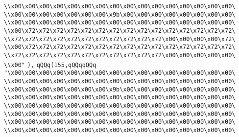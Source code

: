\verb|\\x00\x00\x00\x00\x00\x00\x00\x00\x00\x00\x00\x00\x00\x00\x00\x00\|\newline
\verb|\\x00\x00\x00\x00\x00\x00\x00\x9b\x00\x00\x00\x00\x00\x00\x00\x00\|\newline
\verb|\\x00\x00\x00\x00\x00\x00\x00\x00\x00\x00\x00\x00\x00\x00\x00\x00\|\newline
\verb|\\x00\x72\x72\x72\x72\x72\x72\x72\x72\x72\x72\x72\x72\x72\x72\x72\|\newline
\verb|\\x72\x72\x72\x72\x72\x72\x72\x72\x72\x72\x72\x00\x00\x00\x00\x72\|\newline
\verb|\\x00\x72\x72\x72\x72\x72\x72\x72\x72\x72\x72\x72\x72\x72\x72\x72\|\newline
\verb|\\x72\x72\x72\x72\x72\x72\x72\x72\x72\x72\x72\x00\x00\x00\x00\x00\|\newline
\verb|\\x00"|\newline
\verb|),|\newline
\verb|qQQq(155,qQQqqQQq|\newline
\verb|"\x00\x00\x00\x00\x00\x00\x00\x00\x00\x00\x00\x00\x00\x00\x00\x00\|\newline
\verb|\\x00\x00\x00\x00\x00\x00\x00\x00\x00\x00\x00\x00\x00\x00\x00\x00\|\newline
\verb|\\x00\x00\x00\x00\x00\x00\x00\x9b\x00\x00\x00\x00\x00\x00\x00\x00\|\newline
\verb|\\x00\x00\x00\x00\x00\x00\x00\x00\x00\x00\x00\x00\x00\x00\x00\x00\|\newline
\verb|\\x00\x00\x00\x00\x00\x00\x00\x00\x00\x00\x00\x00\x00\x00\x00\x00\|\newline
\verb|\\x00\x00\x00\x00\x00\x00\x00\x00\x00\x00\x00\x00\x00\x00\x00\x00\|\newline
\verb|\\x00\x00\x00\x00\x00\x00\x00\x00\x00\x00\x00\x00\x00\x00\x00\x00\|\newline
\verb|\\x00\x00\x00\x00\x00\x00\x00\x00\x00\x00\x00\x00\x00\x00\x00\x00\|\newline
